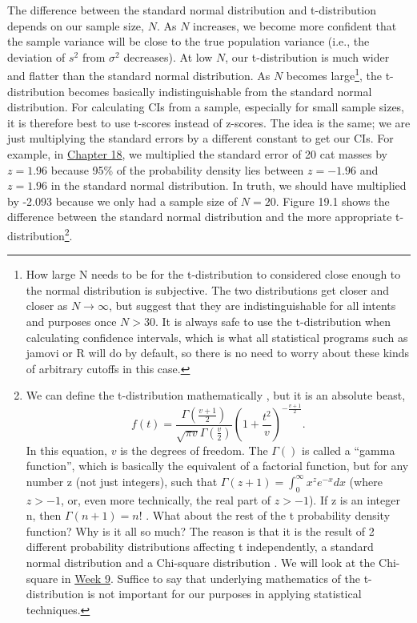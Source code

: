 \documentclass[
  openany]{scrbook}
\begin{document}
The difference between the standard normal distribution and t-distribution depends on our sample size, \(N\).
As \(N\) increases, we become more confident that the sample variance will be close to the true population variance (i.e., the deviation of \(s^{2}\) from \(\sigma^{2}\) decreases).
At low \(N\), our t-distribution is much wider and flatter than the standard normal distribution.
As \(N\) becomes large\footnote{How large N needs to be for the t-distribution to considered close enough to the normal distribution is subjective. The two distributions get closer and closer as \(N \to \infty\), but \citet{Sokal1995} suggest that they are indistinguishable for all intents and purposes once \(N > 30\). It is always safe to use the t-distribution when calculating confidence intervals, which is what all statistical programs such as jamovi or R will do by default, so there is no need to worry about these kinds of arbitrary cutoffs in this case.}, the t-distribution becomes basically indistinguishable from the standard normal distribution.
For calculating CIs from a sample, especially for small sample sizes, it is therefore best to use t-scores instead of z-scores.
The idea is the same; we are just multiplying the standard errors by a different constant to get our CIs.
For example, in \protect\hyperlink{Chapter_18}{Chapter 18}, we multiplied the standard error of 20 cat masses by \(z = 1.96\) because 95\% of the probability density lies between \(z = -1.96\) and \(z = 1.96\) in the standard normal distribution.
In truth, we should have multiplied by -2.093 because we only had a sample size of \(N = 20\).
Figure 19.1 shows the difference between the standard normal distribution and the more appropriate t-distribution\footnote{We can define the t-distribution mathematically \citep{Miller2004}, but it is an absolute beast, \[f(t) = \frac{\Gamma\left(\frac{v + 1}{2} \right)}{\sqrt{\pi v} \Gamma{\left(\frac{v}{2}\right)}}\left(1 + \frac{t^{2}}{v} \right)^{-\frac{v + 1}{2}}.\] In this equation, \(v\) is the degrees of freedom. The \(\Gamma\left(\right)\) is called a ``gamma function'', which is basically the equivalent of a factorial function, but for any number z (not just integers), such that \(\Gamma(z + 1) = \int_{0}^{\infty}x^{z}e^{-x}dx\) (where \(z > -1\), or, even more technically, the real part of \(z > -1\)). If z is an integer n, then \(\Gamma\left({n + 1}\right) = n!\) \citep{Borowski2005}. What about the rest of the t probability density function? Why is it all so much? The reason is that it is the result of 2 different probability distributions affecting t independently, a standard normal distribution and a Chi-square distribution \citep{Miller2004}. We will look at the Chi-square in \protect\hyperlink{Week_9}{Week 9}. Suffice to say that underlying mathematics of the t-distribution is not important for our purposes in applying statistical techniques.}.
\end{document}
